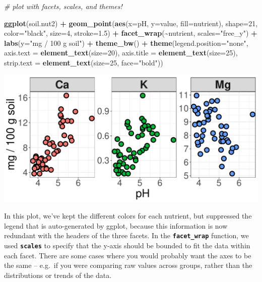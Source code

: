 \documentclass[
]{article}
\newenvironment{Shaded}{\begin{snugshade}}{\end{snugshade}}
\newcommand{\AttributeTok}[1]{\textcolor[rgb]{0.13,0.29,0.53}{#1}}
\newcommand{\CommentTok}[1]{\textcolor[rgb]{0.56,0.35,0.01}{\textit{#1}}}
\newcommand{\DecValTok}[1]{\textcolor[rgb]{0.00,0.00,0.81}{#1}}
\newcommand{\FloatTok}[1]{\textcolor[rgb]{0.00,0.00,0.81}{#1}}
\newcommand{\FunctionTok}[1]{\textcolor[rgb]{0.13,0.29,0.53}{\textbf{#1}}}
\newcommand{\NormalTok}[1]{#1}
\newcommand{\SpecialCharTok}[1]{\textcolor[rgb]{0.81,0.36,0.00}{\textbf{#1}}}
\newcommand{\StringTok}[1]{\textcolor[rgb]{0.31,0.60,0.02}{#1}}
\begin{document}
\begin{Shaded}
\begin{Highlighting}[]
\CommentTok{\# plot with facets, scales, and themes!}

\FunctionTok{ggplot}\NormalTok{(soil.nut2) }\SpecialCharTok{+}
  \FunctionTok{geom\_point}\NormalTok{(}\FunctionTok{aes}\NormalTok{(}\AttributeTok{x=}\NormalTok{pH, }\AttributeTok{y=}\NormalTok{value, }\AttributeTok{fill=}\NormalTok{nutrient), }
             \AttributeTok{shape=}\DecValTok{21}\NormalTok{, }\AttributeTok{color=}\StringTok{"black"}\NormalTok{, }\AttributeTok{size=}\DecValTok{4}\NormalTok{, }\AttributeTok{stroke=}\FloatTok{1.5}\NormalTok{) }\SpecialCharTok{+}
  \FunctionTok{facet\_wrap}\NormalTok{(}\SpecialCharTok{\textasciitilde{}}\NormalTok{nutrient, }\AttributeTok{scales=}\StringTok{"free\_y"}\NormalTok{) }\SpecialCharTok{+}
  \FunctionTok{labs}\NormalTok{(}\AttributeTok{y=}\StringTok{"mg / 100 g soil"}\NormalTok{) }\SpecialCharTok{+}
  \FunctionTok{theme\_bw}\NormalTok{() }\SpecialCharTok{+}
  \FunctionTok{theme}\NormalTok{(}\AttributeTok{legend.position=}\StringTok{"none"}\NormalTok{,}
        \AttributeTok{axis.text =} \FunctionTok{element\_text}\NormalTok{(}\AttributeTok{size=}\DecValTok{20}\NormalTok{),}
        \AttributeTok{axis.title =} \FunctionTok{element\_text}\NormalTok{(}\AttributeTok{size=}\DecValTok{25}\NormalTok{),}
        \AttributeTok{strip.text =} \FunctionTok{element\_text}\NormalTok{(}\AttributeTok{size=}\DecValTok{25}\NormalTok{, }\AttributeTok{face=}\StringTok{"bold"}\NormalTok{))}
\end{Highlighting}
\end{Shaded}

\includegraphics{module1_3_files/figure-latex/unnamed-chunk-32-1.pdf}

In this plot, we've kept the different colors for each nutrient, but
suppressed the legend that is auto-generated by ggplot, because this
information is now redundant with the headers of the three facets. In
the \textbf{\texttt{facet\_wrap}} function, we used
\textbf{\texttt{scales}} to specify that the y-axis should be bounded to
fit the data within each facet. There are some cases where you would
probably want the axes to be the same -- e.g.~if you were comparing raw
values across groups, rather than the distributions or trends of the
data.
\end{document}
